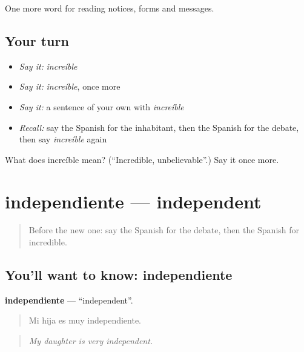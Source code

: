 \begin{grammarlens}[title={What you've built}]
One more word for reading notices, forms and messages.
\end{grammarlens}

\subsection*{Your turn}
\begin{itemize}
\raggedright
  \item \emph{Say it:} \emph{increíble}
  \item \emph{Say it:} \emph{increíble}, once more
  \item \emph{Say it:} a sentence of your own with \emph{increíble}
  \item \emph{Recall:} say the Spanish for the inhabitant, then the Spanish for the debate, then say \emph{increíble} again
\end{itemize}

\begin{tcolorbox}[breakable,colback=teal!4,colframe=teal!35!black,title={Before you move on}]
What does increíble mean? (\textquotedblleft{}Incredible, unbelievable\textquotedblright{}.) Say it once more.
\end{tcolorbox}
\section[independiente]{independiente — independent}

\label{lesson:ES-C508-independiente}



\begin{quote}
Before the new one: say the Spanish for the debate, then the Spanish for incredible.
\end{quote}

\subsection*{You'll want to know: independiente}
\textbf{independiente} — \textquotedblleft{}independent\textquotedblright{}.

\begin{quote}
Mi hija es muy independiente.
\end{quote}

\begin{quote}
\emph{My daughter is very independent.}
\end{quote}

